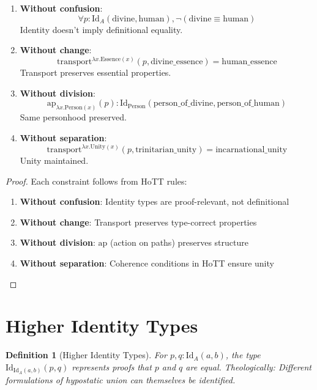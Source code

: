 \documentclass{article}
\newtheorem{definition}{Definition}
\begin{document}
\begin{enumerate}
    \item \textbf{Without confusion}:
    \[
    \forall p : \mathrm{Id}_A(\text{divine}, \text{human}), \neg(\text{divine} \equiv \text{human})
    \]
    Identity doesn't imply definitional equality.

    \item \textbf{Without change}:
    \[
    \mathrm{transport}^{\lambda x. \text{Essence}(x)}(p, \text{divine\_essence}) = \text{human\_essence}
    \]
    Transport preserves essential properties.

    \item \textbf{Without division}:
    \[
    \mathrm{ap}_{\lambda x. \text{Person}(x)}(p) : \mathrm{Id}_{\text{Person}}(\text{person\_of\_divine}, \text{person\_of\_human})
    \]
    Same personhood preserved.

    \item \textbf{Without separation}:
    \[
    \mathrm{transport}^{\lambda x. \text{Unity}(x)}(p, \text{trinitarian\_unity}) = \text{incarnational\_unity}
    \]
    Unity maintained.
\end{enumerate}

\begin{proof}
Each constraint follows from HoTT rules:
\begin{enumerate}
    \item \textbf{Without confusion}: Identity types are proof-relevant, not definitional
    \item \textbf{Without change}: Transport preserves type-correct properties
    \item \textbf{Without division}: $\mathrm{ap}$ (action on paths) preserves structure
    \item \textbf{Without separation}: Coherence conditions in HoTT ensure unity
\end{enumerate}
\end{proof}

\section{Higher Identity Types}

\begin{definition}[Higher Identity Types]
For $p, q : \mathrm{Id}_A(a, b)$, the type $\mathrm{Id}_{\mathrm{Id}_A(a, b)}(p, q)$ represents proofs that $p$ and $q$ are equal. Theologically: Different formulations of hypostatic union can themselves be identified.
\end{definition}
\end{document}
